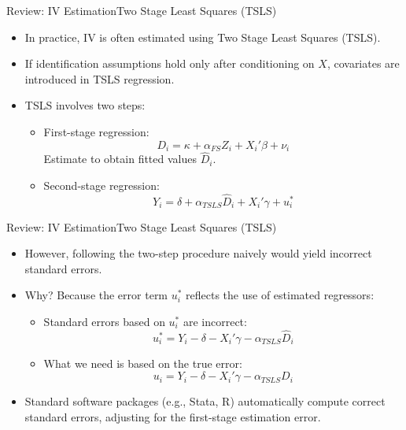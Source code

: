 \documentclass[dvipsnames,hyperref={pdfpagelabels=false}]{beamer}
\begin{document}
\begin{frame}{Review: IV Estimation}{Two Stage Least Squares (TSLS)}
	\begin{itemize} 
		
	\item In practice, IV is often estimated using Two Stage Least Squares (TSLS).
	\vspace{0.3cm}
	\item If identification assumptions hold only after conditioning on $X$, covariates are introduced in TSLS regression.
	\vspace{0.3cm}
	\item TSLS involves two steps:
	\vspace{0.3cm}
	\begin{itemize}
		\item[1.] First-stage regression:
		\begin{equation*}
			D_i = \kappa + \alpha_{FS} Z_i + X_i' \beta + \nu_i
		\end{equation*}
			\vspace{0.3cm}
		Estimate to obtain fitted values $\hat{D}_i$.
		\item[2.] Second-stage regression:
		\begin{equation*}
			Y_i = \delta + \alpha_{TSLS} \hat{D}_i + X_i' \gamma + u^*_i
		\end{equation*}
	\end{itemize}
		\end{itemize}
\end{frame}


\begin{frame}{Review: IV Estimation}{Two Stage Least Squares (TSLS)}
	\begin{itemize}
	\item However, following the two-step procedure naively would yield incorrect standard errors.
	\vspace{0.3cm}
	\item Why? Because the error term $u^*_i$ reflects the use of estimated regressors:
	\vspace{0.3cm}
	\begin{itemize}
		\item Standard errors based on $u^*_i$ are incorrect:
		\[
		u^*_i = Y_i - \delta - X_i'\gamma - \alpha_{TSLS} \hat{D}_i
		\]
		
			\vspace{0.3cm}
		\item What we need is based on the true error:
		\[
		u_i = Y_i - \delta - X_i'\gamma - \alpha_{TSLS} D_i
		\]
	\end{itemize}
	\item Standard software packages (e.g., Stata, R) automatically compute correct standard errors, adjusting for the first-stage estimation error.
	
		
	\end{itemize}
\end{frame}
\end{document}
